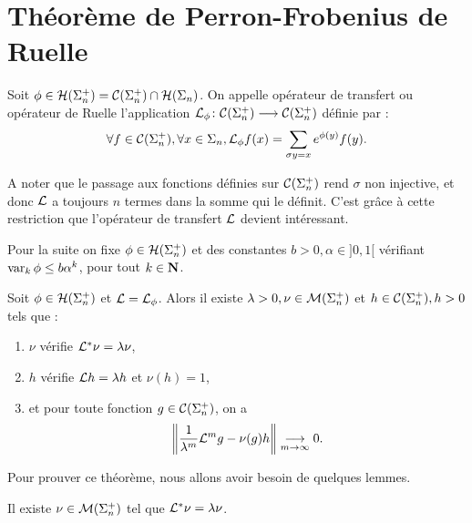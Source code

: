 \section{Théorème de Perron-Frobenius de Ruelle}

  \begin{definition}
    \label{def:transfert_operator}
    Soit $\phi \in \mathcal{H} (\Sigma_{n}^+) = \mathcal{C} (\Sigma_{n}^+) \cap \mathcal{H} (\Sigma_{n})$. On appelle opérateur de transfert ou opérateur de Ruelle l'application
    $\mathcal{L}_{\phi} \colon \mathcal{C} (\Sigma_{n}^+) \longrightarrow \mathcal{C} (\Sigma_{n}^+) $ définie par :
    $$ \forall f \in \mathcal{C} (\Sigma_{n}^+), \forall x \in \Sigma_n, \mathcal{L}_{\phi}f(x) = \sum_{\sigma y = x}{e^{\phi(y)}f(y)}.$$
  \end{definition}

  \begin{remark}
    A noter que le passage aux fonctions définies sur $\mathcal{C} (\Sigma_{n}^+)$ rend $\sigma$ non injective, et donc $\mathcal{L}$ a toujours $n$ termes dans la somme
    qui le définit. C'est grâce à cette restriction que l'opérateur de transfert $\mathcal{L}$ devient intéressant.
  \end{remark}

  Pour la suite on fixe $\phi \in \mathcal{H} (\Sigma_{n}^+)$ et des constantes $b > 0, \alpha \in ]0, 1[$ vérifiant $\operatorname{var}_k\phi \leq b\alpha^k$, pour tout $k \in \mathbf N$.

  \begin{theorem}
    \label{thm:rpf}
    Soit $\phi \in \mathcal{H} (\Sigma_{n}^+)$ et $\mathcal{L} = \mathcal{L}_{\phi}$. Alors il existe $\lambda > 0, \nu \in \mathcal{M} (\Sigma_{n}^+)$ et $h \in \mathcal{C} (\Sigma_{n}^+), h > 0$ tels que :
    \begin{enumerate}
      \item $\nu$ vérifie $\mathcal{L}^*\nu = \lambda\nu$,
      \item $h$ vérifie $\mathcal{L} h = \lambda h$ et $\nu(h) = 1$,
      \item et pour toute fonction $g \in \mathcal{C} (\Sigma_{n}^+)$, on a
	$$\left\lVert \frac 1 {\lambda^m} \mathcal{L}^mg - \nu(g)h\right\rVert \underset{m\to\infty}{\longrightarrow} 0.$$
    \end{enumerate}
  \end{theorem}

  Pour prouver ce théorème, nous allons avoir besoin de quelques lemmes.

  \begin{proposition}
    \label{prop:rpf_1}
    Il existe $\nu \in \mathcal{M} (\Sigma_{n}^+)$ tel que $\mathcal{L}^*\nu = \lambda\nu$.
  \end{proposition}

